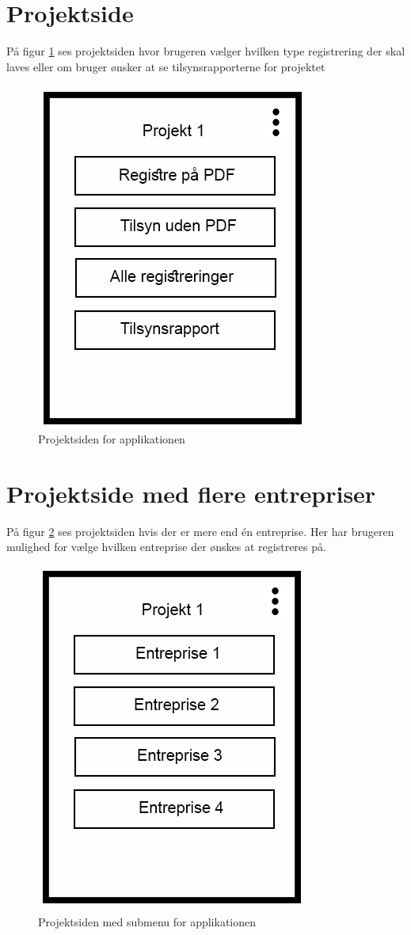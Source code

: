 \section{Projektside}\label{sec:ProjektsideMock}
På figur \ref{fig:ProjektsideMock} ses projektsiden hvor brugeren vælger hvilken type registrering der skal laves eller om bruger ønsker at se tilsynsrapporterne for projektet

\begin{figure}[H]
	\centering
	\includegraphics[width=0.4\linewidth]{MockUps/Mock/Ramboell-Registrer}
	\caption{Projektsiden for applikationen}
	\label{fig:ProjektsideMock}
\end{figure}

\clearpage

\section{Projektside med flere entrepriser}\label{sec:ProjektsideEntrepriseMock}
På figur \ref{fig:ProjektsideEntrepriseMock} ses projektsiden hvis der er mere end én entreprise. Her har brugeren mulighed for vælge hvilken entreprise der ønskes at registreres på.

\begin{figure}[H]
	\centering
	\includegraphics[width=0.4\linewidth]{MockUps/Mock/Ramboell-Entreprise}
	\caption{Projektsiden med submenu for applikationen}
	\label{fig:ProjektsideEntrepriseMock}
\end{figure}

